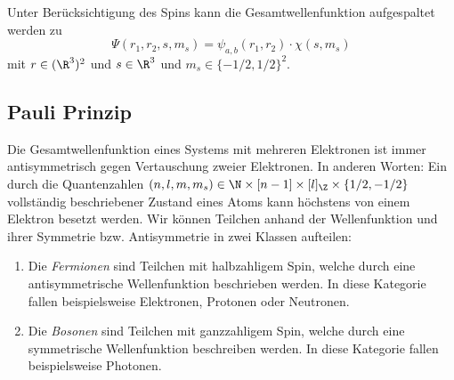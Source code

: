 \documentclass{subfiles}
\begin{document}

    Unter Berücksichtigung des Spins kann die Gesamtwellenfunktion aufgespaltet werden zu
    \[
        \Psi(r_1,r_2,s,m_s) = \psi_{a,b}(r_1,r_2)\cdot\chi(s,m_s)    
    \]
    mit $r\in(\R^3)^2$ und $s\in\R^3$ und $m_s\in\{-1/2,1/2\}^2$. 

    \subsection{Pauli Prinzip}\label{subsec:PauliPrinzip}
        Die Gesamtwellenfunktion eines Systems mit mehreren Elektronen ist immer antisymmetrisch gegen Vertauschung zweier Elektronen. In anderen Worten: 
        Ein durch die Quantenzahlen $(n,l,m,m_s)\in\N\times[n-1]\times[l]_\Z\times\{1/2,-1/2\}$ vollständig beschriebener Zustand eines Atoms kann höchstens von einem Elektron besetzt werden. Wir können Teilchen anhand der Wellenfunktion und ihrer Symmetrie bzw. Antisymmetrie in zwei Klassen aufteilen:
        \begin{enumerate}[label=(\roman*)]
            \item Die \emph{Fermionen} sind Teilchen mit halbzahligem Spin, welche durch eine antisymmetrische Wellenfunktion beschrieben werden. In diese Kategorie fallen beispielsweise Elektronen, Protonen oder Neutronen.
            \item Die \emph{Bosonen} sind Teilchen mit ganzzahligem Spin, welche durch eine symmetrische Wellenfunktion beschreiben werden. In diese Kategorie fallen beispielsweise Photonen.
        \end{enumerate}
\end{document}
